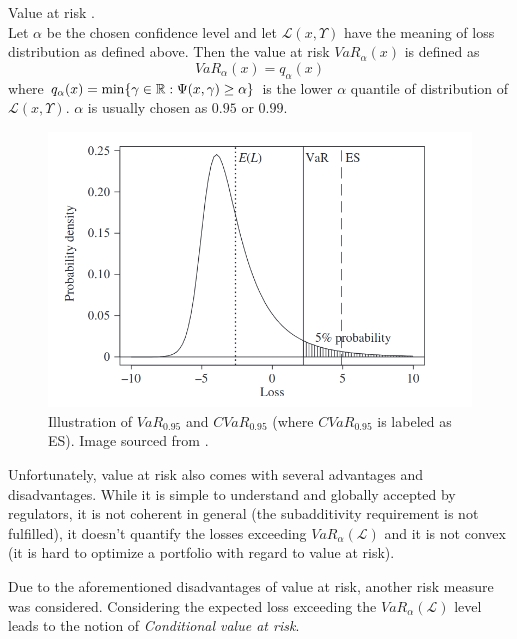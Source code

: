 \begin{defn}{Value at risk \cite[p. 275]{cornuejols_tutuncu_2006}.}  \\
Let $\alpha$ be the chosen confidence level and let $\mathcal{L}(x,\Upsilon)$ have the meaning of loss distribution as defined above. Then the value at risk $VaR_{\alpha}(x)$ is defined as
\begin{equation*}
VaR_{\alpha}(x)=q_{\alpha}(x)
\end{equation*}
where $q_{\alpha}(x)=\mathrm{min}\{\gamma \in \mathbb{R}: \Psi(x,\gamma) \geq \alpha \}$ is the lower $\alpha$ quantile of distribution of $\mathcal{L}(x,\Upsilon)$. $\alpha$ is usually chosen as $0.95$ or $0.99$.
\end{defn}

\begin{figure}
  \includegraphics[width=\linewidth]{../img/VaR_CVaR_graph_theory.png}
  \caption{Illustration of $VaR_{0.95}$ and $CVaR_{0.95}$ (where $CVaR_{0.95}$ is labeled as ES). Image sourced from \cite[Figure 2.2.]{mcneil2015quantitative}.}
  \label{fig:VaR_CVaR_graph_theory}
\end{figure}

Unfortunately, value at risk also comes with several advantages and disadvantages. While it is simple to understand and globally accepted by regulators, it is not coherent in general (the subadditivity requirement is not fulfilled), it doesn't quantify the losses exceeding $VaR_{\alpha}(\mathcal{L})$ and it is not convex (it is hard to optimize a portfolio with regard to value at risk).

Due to the aforementioned disadvantages of value at risk, another risk measure was considered.
Considering the expected loss exceeding the $VaR_{\alpha}(\mathcal{L})$ level leads to the notion of \textit{Conditional value at risk}. 

